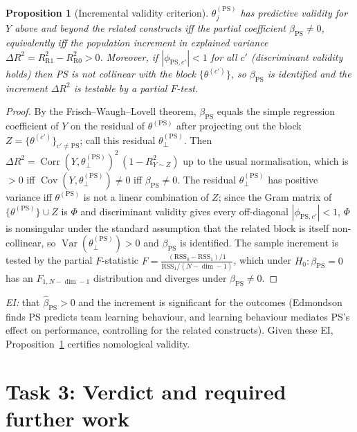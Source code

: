 \documentclass{amsart}
\newtheorem{proposition}{Proposition}
\theoremstyle{remark}
\begin{document}
\begin{proposition}[Incremental validity criterion]\label{prop:incr}
$\theta^{(\mathrm{PS})}_j$ has predictive validity for $Y$ \emph{above and beyond}
the related constructs iff the partial coefficient $\beta_{\mathrm{PS}}\neq0$,
equivalently iff the population increment in explained variance
$\Delta R^2=R^2_{\mathrm{R1}}-R^2_{\mathrm{R0}}>0$. Moreover, if
$|\phi_{\mathrm{PS},c'}|<1$ for all $c'$ (discriminant validity holds) then PS is
not collinear with the block $\{\theta^{(c')}\}$, so $\beta_{\mathrm{PS}}$ is
identified and the increment $\Delta R^2$ is testable by a partial $F$-test.
\end{proposition}
\begin{proof}
By the Frisch--Waugh--Lovell theorem, $\beta_{\mathrm{PS}}$ equals the simple
regression coefficient of $Y$ on the residual of $\theta^{(\mathrm{PS})}$ after
projecting out the block $Z=\{\theta^{(c')}\}_{c'\neq\mathrm{PS}}$; call this
residual $\theta^{(\mathrm{PS})}_{\perp}$. Then
$\Delta R^2=\operatorname{Corr}(Y,\theta^{(\mathrm{PS})}_\perp)^2\,(1-R^2_{Y\sim Z})$ up to the
usual normalisation, which is $>0$ iff
$\operatorname{Cov}(Y,\theta^{(\mathrm{PS})}_\perp)\neq0$ iff $\beta_{\mathrm{PS}}\neq0$. The
residual $\theta^{(\mathrm{PS})}_\perp$ has positive variance iff
$\theta^{(\mathrm{PS})}$ is not a linear combination of $Z$; since the Gram matrix
of $\{\theta^{(\mathrm{PS})}\}\cup Z$ is $\Phi$ and discriminant validity gives every
off-diagonal $|\phi_{\mathrm{PS},c'}|<1$, $\Phi$ is nonsingular under the standard
assumption that the related block is itself non-collinear, so
$\operatorname{Var}(\theta^{(\mathrm{PS})}_\perp)>0$ and $\beta_{\mathrm{PS}}$ is identified. The
sample increment is tested by the partial $F$-statistic
$F=\frac{(\mathrm{RSS}_0-\mathrm{RSS}_1)/1}{\mathrm{RSS}_1/(N-\dim-1)}$, which under
$H_0:\beta_{\mathrm{PS}}=0$ has an $F_{1,N-\dim-1}$ distribution and diverges under
$\beta_{\mathrm{PS}}\neq0$. \end{proof}
\emph{EI:} that $\hat\beta_{\mathrm{PS}}>0$ and the increment is significant for
the outcomes (Edmondson finds PS predicts team learning behaviour, and learning
behaviour mediates PS's effect on performance, controlling for the related
constructs). Given these EI, Proposition~\ref{prop:incr} certifies nomological
validity.

\section{Task 3: Verdict and required further work}\label{sec:verdict}
\end{document}
